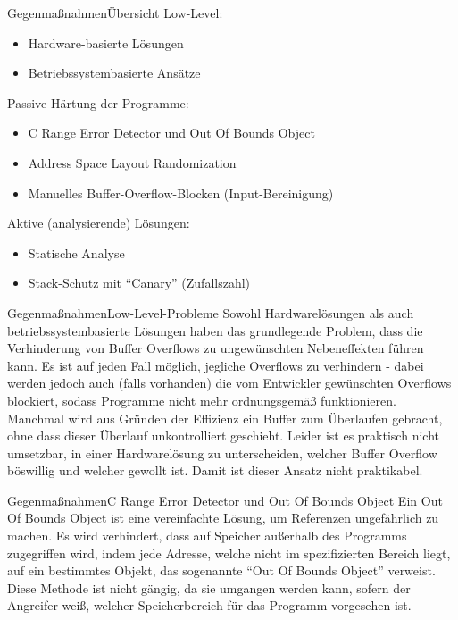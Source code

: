 \pagebreak
\begin{frame}{Gegenmaßnahmen}{Übersicht}
    Low-Level:
\begin{itemize}
    \item Hardware-basierte Lösungen
    \item Betriebssystembasierte Ansätze
\end{itemize}
Passive Härtung der Programme:
\begin{itemize}
    \item C Range Error Detector und Out Of Bounds Object
    \item Address Space Layout Randomization
    \item Manuelles Buffer-Overflow-Blocken (Input-Bereinigung)
\end{itemize}
Aktive (analysierende) Lösungen:
\begin{itemize}
    \item Statische Analyse
    \item Stack-Schutz mit ``Canary'' (Zufallszahl)
\end{itemize}
\end{frame}



\begin{frame}{Gegenmaßnahmen}{Low-Level-Probleme}
    Sowohl Hardwarelösungen als auch betriebssystembasierte Lösungen haben
    das grundlegende Problem, dass die Verhinderung von Buffer Overflows zu
    ungewünschten Nebeneffekten führen kann. Es ist auf jeden Fall möglich,
    jegliche Overflows zu verhindern - dabei werden jedoch auch (falls vorhanden) die vom
    Entwickler gewünschten Overflows blockiert, sodass Programme nicht mehr
    ordnungsgemäß funktionieren. Manchmal wird aus Gründen der Effizienz ein
    Buffer zum Überlaufen gebracht, ohne dass dieser Überlauf unkontrolliert
    geschieht. Leider ist es praktisch nicht umsetzbar, in einer Hardwarelösung
    zu unterscheiden, welcher Buffer Overflow böswillig und welcher gewollt ist. 
    Damit ist dieser Ansatz nicht praktikabel.
\end{frame}

\begin{frame}{Gegenmaßnahmen}{C Range Error Detector und Out Of Bounds Object}
    Ein Out Of Bounds Object ist eine vereinfachte Lösung, um Referenzen ungefährlich zu machen.
    Es wird verhindert, dass auf Speicher außerhalb des Programms zugegriffen wird, indem jede
    Adresse, welche nicht im spezifizierten Bereich liegt, auf ein bestimmtes Objekt, das sogenannte
    ``Out Of Bounds Object'' verweist. Diese Methode ist nicht gängig, da sie
    umgangen werden kann, sofern der Angreifer weiß, welcher Speicherbereich für das Programm
    vorgesehen ist.
\end{frame}





